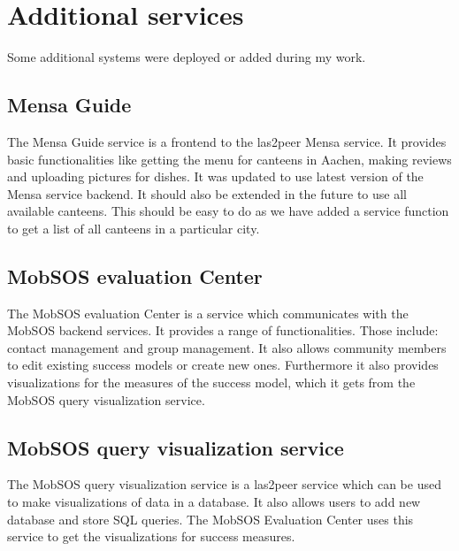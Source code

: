 \section{Additional services}\label{sec:additional}
Some additional systems were deployed or added during my work.

\subsection{Mensa Guide}
The Mensa Guide service is a frontend to the las2peer Mensa service. It provides basic functionalities like getting the menu for canteens in Aachen, making reviews and uploading pictures for dishes. It was updated to use latest version of the Mensa service backend. It should also be extended in the future to use all available canteens. This should be easy to do as we have added a service function to get a list of all canteens in a particular city.

\subsection{MobSOS evaluation Center}
The MobSOS evaluation Center is a service which communicates with the MobSOS backend services. It provides a range of functionalities. Those include: contact management and group management. 
It also allows community members to edit existing success models or create new ones.
Furthermore it also provides visualizations for the measures of the success model, which it gets from the MobSOS query visualization service.

\subsection{MobSOS query visualization service}
The MobSOS query visualization service is a las2peer service which can be used to make visualizations of data in a database. It also allows users to add new database and store SQL queries. The MobSOS Evaluation Center uses this service to get the visualizations for success measures.






